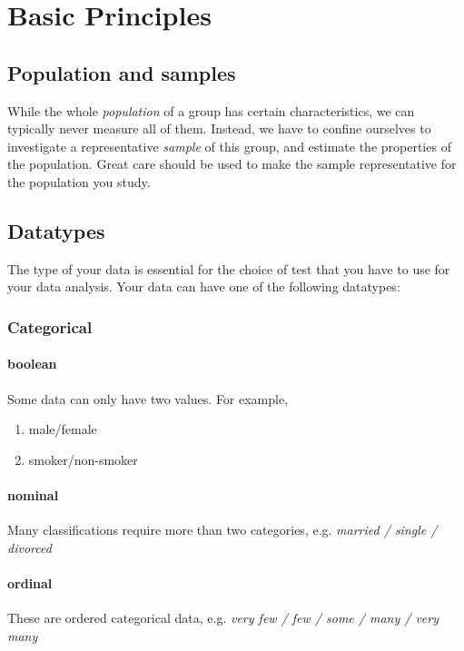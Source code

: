 \chapter{Basic Principles}

\section{Population and samples}

While the whole \emph{population} of a group has certain characteristics,
we can typically never measure all of them. Instead, we have to confine
ourselves to investigate a representative \emph{sample} of this group, and
estimate the properties of the population. Great care should be used to make the sample
representative for the population you study.

\section{Datatypes}

The type of your data is essential for the choice of test that you have to use for your data analysis. Your data can have one of the following datatypes:

\subsection{Categorical} 

\subsubsection{boolean}
Some data can only have two values. For example,
\begin{enumerate}
  \item male/female
  \item smoker/non-smoker
\end{enumerate}

\subsubsection{nominal}
Many classifications require more than two categories, e.g. \emph{married / single / divorced}

\subsubsection{ordinal}
These are ordered categorical data, e.g. \emph{very few / few / some / many / very many}

